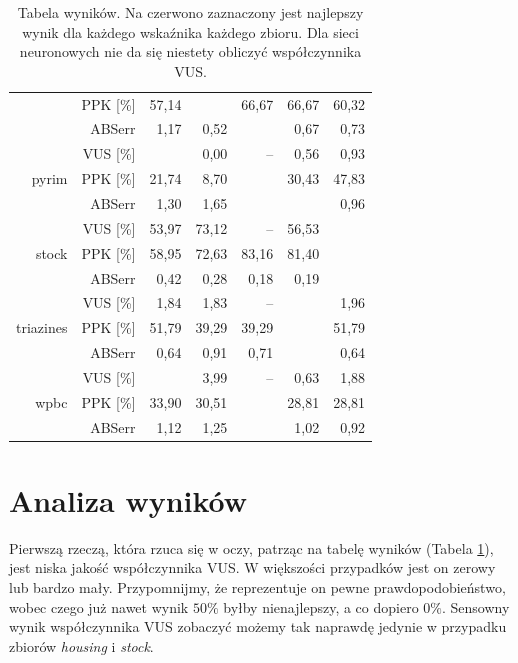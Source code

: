 \documentclass{mini}
\begin{document}
\begin{table}[h!t]
\begin{tabular}{rrrrrrr}
   & PPK [\%] & 57,14 & \color{red}{68,25} & 66,67 & 66,67 & 60,32 \\ 
   & ABSerr & 1,17 & 0,52 & \color{red}{0,51} & 0,67 & 0,73 \\ 
   \hline
\multirow{3}{15mm}{pyrim} & VUS [\%] & \color{red}{1,11} & 0,00 & -- & 0,56 & 0,93 \\ 
   & PPK [\%] & 21,74 & 8,70 & \color{red}{52,17} & 30,43 & 47,83 \\ 
   & ABSerr & 1,30 & 1,65 & \color{red}{0,91} & \color{red}{0,91} & 0,96 \\ 
   \hline
\multirow{3}{15mm}{stock} & VUS [\%] & 53,97 & 73,12 & -- & 56,53 & \color{red}{96,01} \\ 
   & PPK [\%] & 58,95 & 72,63 & 83,16 & 81,40 & \color{red}{91,58} \\ 
   & ABSerr & 0,42 & 0,28 & 0,18 & 0,19 & \color{red}{0,08} \\ 
   \hline
\multirow{3}{15mm}{triazines} & VUS [\%] & 1,84 & 1,83 & -- & \color{red}{5,45} & 1,96 \\ 
   & PPK [\%] & 51,79 & 39,29 & 39,29 & \color{red}{53,57} & 51,79 \\ 
   & ABSerr & 0,64 & 0,91 & 0,71 & \color{red}{0,61} & 0,64 \\ 
   \hline
\multirow{3}{15mm}{wpbc} & VUS [\%] & \color{red}{4,44} & 3,99 & -- & 0,63 & 1,88 \\ 
   & PPK [\%] & 33,90 & 30,51 & \color{red}{35,59} & 28,81 & 28,81 \\ 
   & ABSerr & 1,12 & 1,25 & \color{red}{0,86} & 1,02 & 0,92 \\ 
   \hline
\end{tabular}
\caption{Tabela wyników. Na czerwono zaznaczony jest najlepszy wynik dla każdego wskaźnika każdego zbioru. Dla sieci neuronowych nie da się niestety obliczyć współczynnika VUS.}
\label{wyniki} 
\end{table}

\section{Analiza wyników}

Pierwszą rzeczą, która rzuca się w oczy, patrząc na tabelę wyników (Tabela \ref{wyniki}), jest niska jakość współczynnika VUS. W większości przypadków jest on zerowy lub bardzo mały. Przypomnijmy, że reprezentuje on pewne prawdopodobieństwo, wobec czego już nawet wynik $50\%$ byłby nienajlepszy, a co dopiero $0\%$. Sensowny wynik współczynnika VUS zobaczyć możemy tak naprawdę jedynie w przypadku zbiorów \textit{housing} i \textit{stock}.
\end{document}
